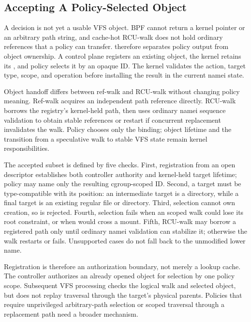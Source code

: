 \subsection{Accepting A Policy-Selected Object}

A decision is not yet a usable VFS object. BPF cannot return a kernel pointer
or an arbitrary path string, and cache-hot RCU-walk does not hold ordinary
references that a policy can transfer. \namei therefore separates policy
output from object ownership. A control plane registers an existing object,
the kernel retains its , and policy selects it by an opaque
ID. The kernel validates the action, target type, scope, and operation before
installing the result in the current namei state.

Object handoff differs between ref-walk and RCU-walk without changing policy meaning.
Ref-walk acquires an independent path reference directly. RCU-walk borrows the
registry's kernel-held path, then uses ordinary namei sequence validation to
obtain stable references or restart if concurrent replacement invalidates the
walk. Policy chooses only the binding; object lifetime and the transition from
a speculative walk to stable VFS state remain kernel responsibilities.

The accepted subset is defined by five checks. First, registration from an
open descriptor establishes both controller authority and kernel-held target
lifetime; policy may name only the resulting cgroup-scoped ID. Second, a target
must be type-compatible with its position: an intermediate target is a
directory, while a final target is an existing regular file or directory.
Third, selection cannot own creation, so  is rejected.
Fourth, selection fails when an  scoped walk could lose its
root constraint, or when  would cross a mount. Fifth,
RCU-walk may borrow a registered path only until ordinary namei validation can
stabilize it; otherwise the walk restarts or fails. Unsupported cases do not
fall back to the unmodified lower name.

Registration is therefore an authorization boundary, not merely a lookup
cache. The controller authorizes an already opened object for selection by one
policy scope. Subsequent VFS processing checks the logical walk and selected
object, but does not replay traversal through the target's physical parents.
Policies that require unprivileged arbitrary-path selection or scoped traversal
through a replacement path need a broader mechanism.

